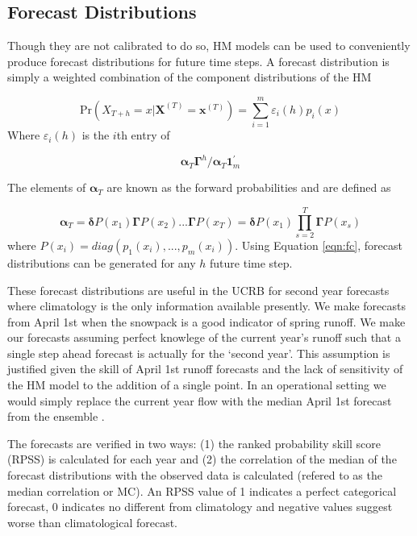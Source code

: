 \documentclass[wrr]{AGUTeX}
\begin{document}
\begin{article}
\subsection{Forecast Distributions}
Though they are not calibrated to do so, HM models can be used to conveniently produce forecast distributions for future time steps.  A forecast distribution is simply a weighted combination of the component distributions of the HM \citep{Zucchini:2009vl}

\begin{equation}
\mbox{Pr}(X_{T+h}=x | \mathbf{X}^{(T)}=\mathbf{x}^{(T)}) = \displaystyle\sum^m_{i=1}\varepsilon_i(h)p_i(x)\label{eqn:fc}
\end{equation}
Where $\varepsilon_i(h)$ is the $i$th entry of 

\begin{equation}
\boldsymbol{\alpha}_T\boldsymbol{\Gamma}^h/\boldsymbol{\alpha}_T\mathbf{1}_m^{'}
\end{equation}

The elements of $\boldsymbol{\alpha}_T$ are known as the forward probabilities and are defined as

\begin{equation}
\boldsymbol{\alpha}_T = \boldsymbol{\delta}P(x_1)\boldsymbol\Gamma P(x_2)...\boldsymbol\Gamma P(x_T) = \boldsymbol{\delta}P(x_1)\displaystyle\prod^T_{s=2}\boldsymbol\Gamma P(x_s)
\end{equation}
where $P(x_i)=diag(p_1(x_i),...,p_m(x_i))$. Using Equation \ref{eqn:fc}, forecast distributions can be generated for any $h$ future time step.

These forecast distributions are useful in the UCRB for second year forecasts where climatology is the only information available presently.  We make forecasts from April 1st when the snowpack is a good indicator of spring runoff.  We make our forecasts assuming perfect knowlege of the current year's runoff such that a single step ahead forecast is actually for the `second year'. This assumption is justified given the skill of April 1st runoff forecasts \citep{Bracken:2010cw} and the lack of sensitivity of the HM model to the addition of a single point.  In an operational setting we would simply replace the current year flow with the median April 1st forecast from the ensemble \citep{Bracken:2010cw}. 

The forecasts are verified in two ways: (1) the ranked probability skill score (RPSS) \citep{Wilks:1995p3976} is calculated for each year and (2) the correlation of the median of the forecast distributions with the observed data is calculated (refered to as the median correlation or MC). An RPSS value of 1 indicates a perfect categorical forecast, 0 indicates no different from climatology and negative values suggest worse than climatological forecast.


\end{article}
\end{document}
